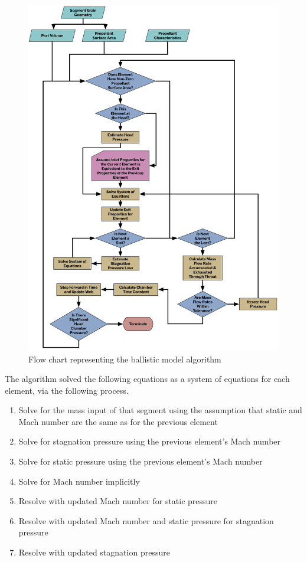 \begin{figure}
    \centering
    \includegraphics[height=0.9\textheight]{images/combustion-flowchart}
    \caption{Flow chart representing the ballistic model algorithm}
    \label{figure:combustion-flowchart}
\end{figure}

The algorithm solved the following equations as a system of equations for each element, via the following process.

\begin{enumerate}
    \item Solve  for the mass input of that segment using the assumption that static and Mach number are the same as for the previous element
    \item Solve  for stagnation pressure using the previous element's Mach number
    \item Solve  for static pressure using the previous element's Mach number
    \item Solve  for Mach number implicitly
    \item Resolve  with updated Mach number for static pressure
    \item Resolve  with updated Mach number and static pressure for stagnation pressure
    \item Resolve  with updated stagnation pressure
\end{enumerate}

